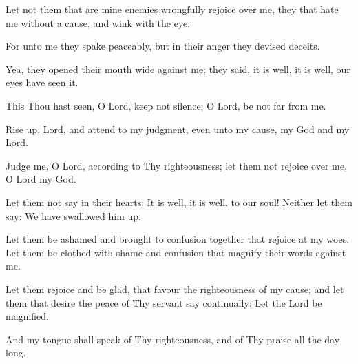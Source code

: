 Let not them that are mine enemies wrongfully rejoice over me, they that hate me without a cause, and wink with the eye.

For unto me they spake peaceably, but in their anger they devised deceits.

Yea, they opened their mouth wide against me; they said, it is well, it is well, our eyes have seen it.

This Thou hast seen, O Lord, keep not silence; O Lord, be not far from me.

Rise up, Lord, and attend to my judgment, even unto my cause, my God and my Lord.

Judge me, O Lord, according to Thy righteousness; let them not rejoice over me, O Lord my God.

Let them not say in their hearts: It is well, it is well, to our soul! Neither let them say: We have swallowed him up.

Let them be ashamed and brought to confusion together that rejoice at my woes. Let them be clothed with shame and confusion that magnify their words against me.

Let them rejoice and be glad, that favour the righteousness of my cause; and let them that desire the peace of Thy servant say continually: Let the Lord be magnified.

And my tongue shall speak of Thy righteousness, and of Thy praise all the day long.

